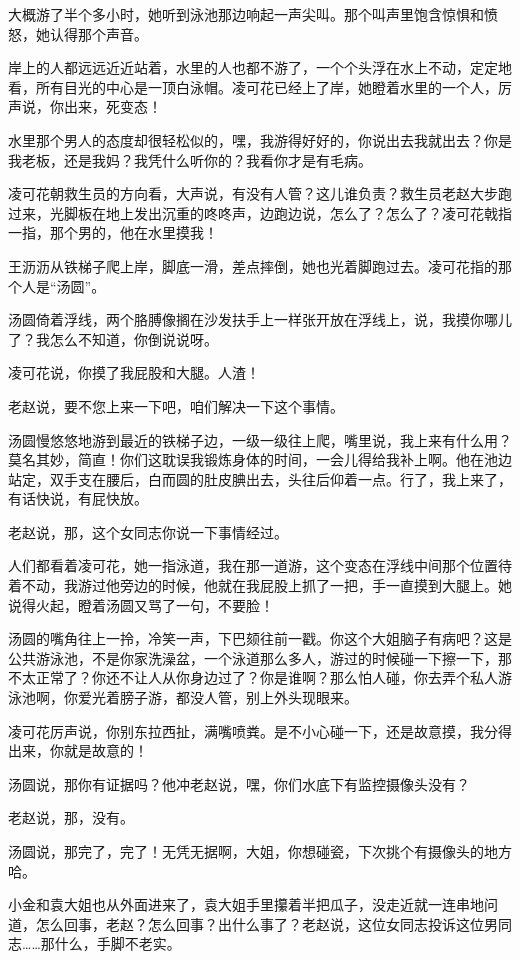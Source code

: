 \documentclass[lang=cn,newtx,12pt,scheme=chinese]{elegantbook}
\begin{document}
大概游了半个多小时，她听到泳池那边响起一声尖叫。那个叫声里饱含惊惧和愤怒，她认得那个声音。

岸上的人都远远近近站着，水里的人也都不游了，一个个头浮在水上不动，定定地看，所有目光的中心是一顶白泳帽。凌可花已经上了岸，她瞪着水里的一个人，厉声说，你出来，死变态！

水里那个男人的态度却很轻松似的，嘿，我游得好好的，你说出去我就出去？你是我老板，还是我妈？我凭什么听你的？我看你才是有毛病。

凌可花朝救生员的方向看，大声说，有没有人管？这儿谁负责？救生员老赵大步跑过来，光脚板在地上发出沉重的咚咚声，边跑边说，怎么了？怎么了？凌可花戟指一指，那个男的，他在水里摸我！

王沥沥从铁梯子爬上岸，脚底一滑，差点摔倒，她也光着脚跑过去。凌可花指的那个人是“汤圆”。

汤圆倚着浮线，两个胳膊像搁在沙发扶手上一样张开放在浮线上，说，我摸你哪儿了？我怎么不知道，你倒说说呀。

凌可花说，你摸了我屁股和大腿。人渣！

老赵说，要不您上来一下吧，咱们解决一下这个事情。

汤圆慢悠悠地游到最近的铁梯子边，一级一级往上爬，嘴里说，我上来有什么用？莫名其妙，简直！你们这耽误我锻炼身体的时间，一会儿得给我补上啊。他在池边站定，双手支在腰后，白而圆的肚皮腆出去，头往后仰着一点。行了，我上来了，有话快说，有屁快放。

老赵说，那，这个女同志你说一下事情经过。

人们都看着凌可花，她一指泳道，我在那一道游，这个变态在浮线中间那个位置待着不动，我游过他旁边的时候，他就在我屁股上抓了一把，手一直摸到大腿上。她说得火起，瞪着汤圆又骂了一句，不要脸！

汤圆的嘴角往上一拎，冷笑一声，下巴颏往前一戳。你这个大姐脑子有病吧？这是公共游泳池，不是你家洗澡盆，一个泳道那么多人，游过的时候碰一下擦一下，那不太正常了？你还不让人从你身边过了？你是谁啊？那么怕人碰，你去弄个私人游泳池啊，你爱光着膀子游，都没人管，别上外头现眼来。

凌可花厉声说，你别东拉西扯，满嘴喷粪。是不小心碰一下，还是故意摸，我分得出来，你就是故意的！

汤圆说，那你有证据吗？他冲老赵说，嘿，你们水底下有监控摄像头没有？

老赵说，那，没有。

汤圆说，那完了，完了！无凭无据啊，大姐，你想碰瓷，下次挑个有摄像头的地方哈。

小金和袁大姐也从外面进来了，袁大姐手里攥着半把瓜子，没走近就一连串地问道，怎么回事，老赵？怎么回事？出什么事了？老赵说，这位女同志投诉这位男同志……那什么，手脚不老实。
\end{document}
